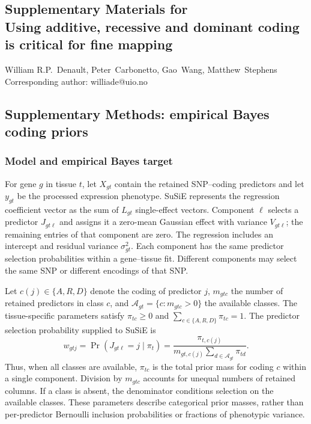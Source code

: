 \documentclass[12pt]{article}
\def\scititle{
	Using additive, recessive and dominant coding is critical for fine mapping 
}
\begin{document}
\clearpage
\renewcommand{\thefigure}{S\arabic{figure}}
\renewcommand{\thetable}{S\arabic{table}}
\renewcommand{\theequation}{S\arabic{equation}}
\renewcommand{\thepage}{S\arabic{page}}
\setcounter{figure}{0}
\setcounter{table}{0}
\setcounter{equation}{0}
\setcounter{page}{1}
\begin{center}
\section*{Supplementary Materials for\\ \scititle}
William R.P.~Denault, Peter~Carbonetto, Gao~Wang, Matthew~Stephens\\
Corresponding author: williade@uio.no
\end{center}
\subsection*{Supplementary Methods: empirical Bayes coding priors}
\label{supp:em-coding-priors}

\subsubsection*{Model and empirical Bayes target}
For gene $g$ in tissue $t$, let $X_{gt}$ contain the retained SNP--coding
predictors and let $y_{gt}$ be the processed expression phenotype. SuSiE
represents the regression coefficient vector as the sum of $L_{gt}$
single-effect vectors. Component $\ell$ selects a predictor
$J_{gt\ell}$ and assigns it a zero-mean Gaussian effect with variance $V_{gt\ell}$;
the remaining entries of that component are zero. The regression includes
an intercept and residual variance $\sigma_{gt}^{2}$. Each component has
the same predictor selection probabilities within a gene--tissue fit.
Different components may select the same SNP or different encodings of
that SNP.

Let $c(j)\in\{A,R,D\}$ denote the coding of predictor $j$,
$m_{gtc}$ the number of retained predictors in class $c$, and
$\mathcal{A}_{gt}=\{c:m_{gtc}>0\}$ the available classes. The tissue-specific
parameters satisfy $\pi_{tc}\geq 0$ and $\sum_{c\in\{A,R,D\}}\pi_{tc}=1$.
The predictor selection probability supplied to SuSiE is
\begin{equation}
 w_{gtj}=\Pr(J_{gt\ell}=j\mid\pi_t)
 =\frac{\pi_{t,c(j)}}
 {m_{gt,c(j)}\sum_{d\in\mathcal{A}_{gt}}\pi_{td}}.
 \label{eq:em-predictor-prior}
\end{equation}
Thus, when all classes are available, $\pi_{tc}$ is the total prior mass
for coding $c$ within a single component. Division by $m_{gtc}$ accounts
for unequal numbers of retained columns. If a class is absent, the
denominator conditions selection on the available classes. These
parameters describe categorical prior masses, rather than per-predictor
Bernoulli inclusion probabilities or fractions of phenotypic variance.
\end{document}
